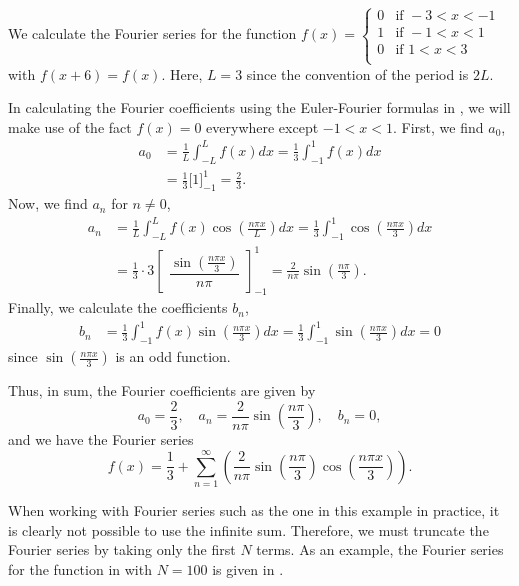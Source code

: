 \begin{eg}\label{eg:fourier1}
	We calculate the Fourier series for the function 
	\( f(x) = \begin{cases} 
		0 & \text{if } -3<x<-1 \\
		1 & \text{if } -1<x<1 \\
		0 & \text{if } 1<x<3 \\
	\end{cases}\)
	with $f(x+6) = f(x)$. Here, $L=3$ since the convention of the period is $2L$. 
	
	In calculating the Fourier coefficients using the Euler-Fourier formulas in , we will make use of the fact $f(x)=0$ everywhere except $-1<x<1$. First, we find $a_0$,
	\begin{align*}
		a_0 &= \frac{1}{L} \int_{-L}^{L} f(x)dx = \frac{1}{3} \int_{-1}^{1} f(x)dx \\
		&= \frac{1}{3} \big[1\big]^1_{-1} = \frac{2}{3}.
	\end{align*}
	Now, we find $a_n$ for $n\neq 0$,
	\begin{align*}
		a_n &= \frac{1}{L} \int_{-L}^L f(x) \cos{\left( \frac{n \pi x}{L} \right)} dx = \frac{1}{3} \int_{-1}^1 \cos{\left( \frac{n \pi x}{3} \right)} dx \\
		&= \frac{1}{3} \cdot 3 \begin{bmatrix} \dfrac{\sin{\left( \frac{n \pi x}{3} \right)}}{n \pi} \end{bmatrix}^1_{-1} = \frac{2}{n \pi} \sin{\left( \frac{n \pi}{3} \right)}.
	\end{align*}
	Finally, we calculate the coefficients $b_n$,
	\begin{align*}
		b_n &= \frac{1}{3} \int_{-1}^1 f(x) \sin{\left( \frac{n \pi x}{3} \right)} dx = \frac{1}{3} \int_{-1}^1 \sin{\left( \frac{n \pi x}{3} \right)} dx = 0
	\end{align*}
	since $\sin\left(\frac{n \pi x}{3}\right)$ is an odd function.
	
	Thus, in sum, the Fourier coefficients are given by
	\[
	a_0 = \frac23, \quad a_n = \frac{2}{n \pi} \sin{\left( \frac{n \pi}{3} \right)}, \quad b_n = 0,
	\]
	and we have the Fourier series
	\[
	f(x) = \frac{1}{3} + \sum_{n=1}^{\infty} \left( \frac{2}{n \pi} \sin{\left( \frac{n \pi}{3} \right)} \cos{\left( \frac{n \pi x}{3} \right)} \right).
	\]
\end{eg}

When working with Fourier series such as the one in this example in practice, it is clearly not possible to use the infinite sum. Therefore, we must truncate the Fourier series by taking only the first $N$ terms. As an example, the Fourier series for the function in  with $N=100$ is given in .

